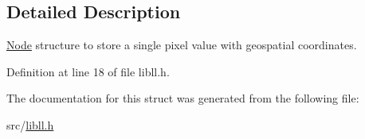 \subsection{Detailed Description}
\hyperlink{structNode}{Node} structure to store a single pixel value with geospatial coordinates. 

Definition at line 18 of file libll.\-h.



The documentation for this struct was generated from the following file\-:\begin{DoxyCompactItemize}
\item 
src/\hyperlink{libll_8h}{libll.\-h}\end{DoxyCompactItemize}
